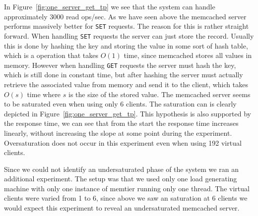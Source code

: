 \documentclass[11pt,a4paper]{article}
\begin{document}
%
In Figure~\ref{fig:one_server_get_tp} we see that the system can handle approximately 3000 read ops/sec.
%
As we have seen above the memcached server performs massively better for \texttt{SET} requests.
%
The reason for this is rather straight forward.
%
When handling \texttt{SET} requests the server can just store the record.
%
Usually this is done by hashing the key and storing the value in some sort of hash table, which is a operation that takes $O(1)$ time, since memcached stores all values in memory.
%
However when handling \texttt{GET} requests the server must hash the key, which is still done in constant time, but after hashing the server must actually retrieve the associated value from memory and send it to the client, which takes $O(s)$ time where $s$ is the size of the stored value.
%
The memcached server seems to be saturated even when using only 6 clients.
%
The saturation can is clearly depicted in Figure~\ref{fig:one_server_get_tp}.
%
This hypothesis is also supported by the response time, we can see that from the start the response time increases linearly, without increasing the slope at some point during the experiment.
%
Oversaturation does not occur in this experiment even when using 192 virtual clients.
%
\par
%
Since we could not identify an undersaturated phase of the system we ran an additional experiment.
%
The setup was that we used only one load generating machine with only one instance of memtier running only one thread.
%
The virtual clients were varied from 1 to 6, since above we saw an saturation at 6 clients we would expect this experiment to reveal an undersaturated memcached server.
%
\end{document}
